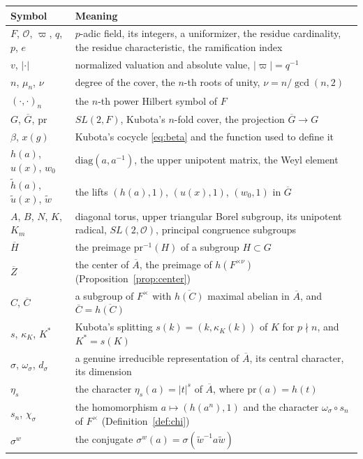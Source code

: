 \documentclass[12pt,letterpaper]{article}
\numberwithin{equation}{section}
\theoremstyle{definition}
\newcommand{\OF}{\mathcal O}
\newcommand{\vp}{\varpi}
\newcommand{\bG}{\overline{G}}
\newcommand{\bA}{\overline{A}}
\newcommand{\bC}{\overline{C}}
\newcommand{\bZ}{\overline{Z}}
\newcommand{\wt}{\tilde w}
\newcommand{\hl}{\tilde h}
\newcommand{\ul}{\tilde u}
\newcommand{\pr}{\mathrm{pr}}
\begin{document}
{\small
\begin{longtable}{@{}>{\raggedright}p{4.3cm}>{\raggedright\arraybackslash}p{11.3cm}@{}}
\toprule
\textbf{Symbol} & \textbf{Meaning} \\
\midrule
\endhead
$F$, $\OF$, $\vp$, $q$, $p$, $e$ & $p$-adic field, its integers, a uniformizer, the residue cardinality, the residue characteristic, the ramification index \\
$v$, $|\cdot|$ & normalized valuation and absolute value, $|\vp|=q^{-1}$ \\
$n$, $\mu_n$, $\nu$ & degree of the cover, the $n$-th roots of unity, $\nu=n/\gcd(n,2)$ \\
$(\cdot,\cdot)_n$ & the $n$-th power Hilbert symbol of $F$ \\
$G$, $\bG$, $\pr$ & $SL(2,F)$, Kubota's $n$-fold cover, the projection $\bG\to G$ \\
$\beta$, $x(g)$ & Kubota's cocycle \eqref{eq:beta} and the function used to define it \\
$h(a)$, $u(x)$, $w_0$ & $\mathrm{diag}(a,a^{-1})$, the upper unipotent matrix, the Weyl element \\
$\hl(a)$, $\ul(x)$, $\wt$ & the lifts $(h(a),1)$, $(u(x),1)$, $(w_0,1)$ in $\bG$ \\
$A$, $B$, $N$, $K$, $K_m$ & diagonal torus, upper triangular Borel subgroup, its unipotent radical, $SL(2,\OF)$, principal congruence subgroups \\
$\overline H$ & the preimage $\pr^{-1}(H)$ of a subgroup $H\subset G$ \\
$\bZ$ & the center of $\bA$, the preimage of $h(F^{\times\nu})$ (Proposition~\ref{prop:center}) \\
$C$, $\bC$ & a subgroup of $F^\times$ with $\overline{h(C)}$ maximal abelian in $\bA$, and $\bC=\overline{h(C)}$ \\
$s$, $\kappa_K$, $K^*$ & Kubota's splitting $s(k)=(k,\kappa_K(k))$ of $K$ for $p\nmid n$, and $K^*=s(K)$ \\
$\sigma$, $\omega_\sigma$, $d_\sigma$ & a genuine irreducible representation of $\bA$, its central character, its dimension \\
$\eta_s$ & the character $\eta_s(a)=|t|^s$ of $\bA$, where $\pr(a)=h(t)$ \\
$s_n$, $\chi_\sigma$ & the homomorphism $a\mapsto(h(a^n),1)$ and the character $\omega_\sigma\circ s_n$ of $F^\times$ (Definition~\ref{def:chi}) \\
$\sigma^w$ & the conjugate $\sigma^w(a)=\sigma(\wt^{-1}a\wt)$ \\

\end{longtable}}
\end{document}
